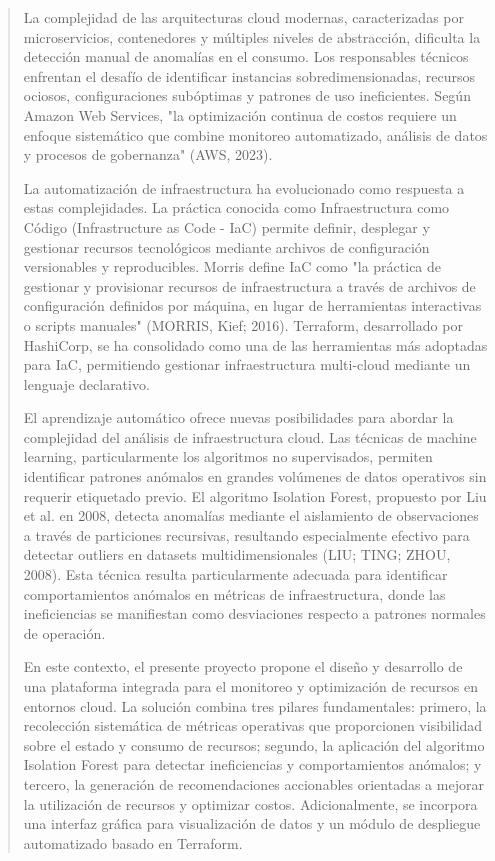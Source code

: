 \documentclass[
]{article}
\begin{document}
\begin{quote}
La complejidad de las arquitecturas cloud modernas, caracterizadas por
microservicios, contenedores y múltiples niveles de abstracción,
dificulta la detección manual de anomalías en el consumo. Los
responsables técnicos enfrentan el desafío de identificar instancias
sobredimensionadas, recursos ociosos, configuraciones subóptimas y
patrones de uso ineficientes. Según Amazon Web Services, "la
optimización continua de costos requiere un enfoque sistemático que
combine monitoreo automatizado, análisis de datos y procesos de
gobernanza" (AWS, 2023).

La automatización de infraestructura ha evolucionado como respuesta a
estas complejidades. La práctica conocida como Infraestructura como
Código (Infrastructure as Code - IaC) permite definir, desplegar y
gestionar recursos tecnológicos mediante archivos de configuración
versionables y reproducibles. Morris define IaC como "la práctica de
gestionar y provisionar recursos de infraestructura a través de archivos
de configuración definidos por máquina, en lugar de herramientas
interactivas o scripts manuales" (MORRIS, Kief; 2016). Terraform,
desarrollado por HashiCorp, se ha consolidado como una de las
herramientas más adoptadas para IaC, permitiendo gestionar
infraestructura multi-cloud mediante un lenguaje declarativo.

El aprendizaje automático ofrece nuevas posibilidades para abordar la
complejidad del análisis de infraestructura cloud. Las técnicas de
machine learning, particularmente los algoritmos no supervisados,
permiten identificar patrones anómalos en grandes volúmenes de datos
operativos sin requerir etiquetado previo. El algoritmo Isolation
Forest, propuesto por Liu et al. en 2008, detecta anomalías mediante el
aislamiento de observaciones a través de particiones recursivas,
resultando especialmente efectivo para detectar outliers en datasets
multidimensionales (LIU; TING; ZHOU, 2008). Esta técnica resulta
particularmente adecuada para identificar comportamientos anómalos en
métricas de infraestructura, donde las ineficiencias se manifiestan como
desviaciones respecto a patrones normales de operación.

En este contexto, el presente proyecto propone el diseño y desarrollo de
una plataforma integrada para el monitoreo y optimización de recursos en
entornos cloud. La solución combina tres pilares fundamentales: primero,
la recolección sistemática de métricas operativas que proporcionen
visibilidad sobre el estado y consumo de recursos; segundo, la
aplicación del algoritmo Isolation Forest para detectar ineficiencias y
comportamientos anómalos; y tercero, la generación de recomendaciones
accionables orientadas a mejorar la utilización de recursos y optimizar
costos. Adicionalmente, se incorpora una interfaz gráfica para
visualización de datos y un módulo de despliegue automatizado basado en
Terraform.


\end{quote}
\end{document}
